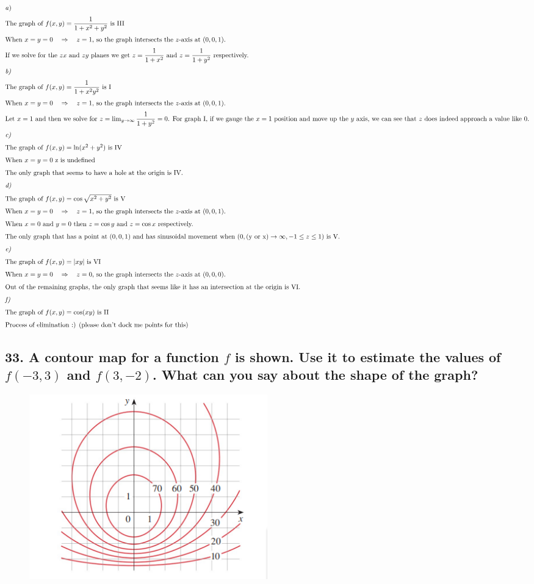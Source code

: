 \documentclass{article}
\newcommand\rr{\quad\Rightarrow\quad}
\begin{document}
\begin{align*}
    \intertext{\textit a)}
    \intertext{The graph of $f(x,y) = \displaystyle\frac 1 {1 + x^2 + y^2}$ is III}
    \intertext{When $x = y = 0 \rr z = 1$, so the graph intersects the $z$-axis at $(0,0,1)$.}
    \intertext{If we solve for the $zx$ and $zy$ planes we get $z = \displaystyle\frac 1 {1 + x^2}$ and $z = \displaystyle\frac 1 {1 + y^2}$ respectively.}
    \intertext{\textit{b)}}
    \intertext{The graph of $f(x,y) = \displaystyle\frac 1 {1 + x^2 y^2}$ is I}
    \intertext{When $x = y = 0 \rr z = 1$, so the graph intersects the $z$-axis at $(0,0,1)$.}
    \intertext{Let $x = 1$ and then we solve for $z = \lim_{y \to \infty} \displaystyle\frac 1 {1 + y^2} = 0$. For graph I, if we gauge the $x = 1$ position and move up the $y$ axis, we can see that $z$ does indeed approach a value like 0.}
    \intertext{\textit{c)}}
    \intertext{The graph of $f(x,y) = \ln (x^2 + y^2)$ is IV}
    \intertext{When $x = y = 0$ z is undefined}
    \intertext{The only graph that seems to have a hole at the origin is IV.}
    \intertext{\textit{d)}} 
    \intertext{The graph of $f(x,y) = \cos \sqrt{x^2 + y^2}$ is V}
    \intertext{When $x = y = 0 \rr z = 1$, so the graph intersects the $z$-axis at $(0,0,1)$.}
    \intertext{When $x = 0$ and $y=0$ then $z=\cos y$ and $z=\cos x$ respectively.}
    \intertext{The only graph that has a point at $(0,0,1)$ and has sinusoidal movement when $(0, (\text{y or x}) \to \infty, -1 \leq z \leq 1)$ is V.}
    \intertext{\textit{e)}}
    \intertext{The graph of $f(x,y) = |xy|$ is VI}
    \intertext{When $x = y = 0 \rr z = 0$, so the graph intersects the $z$-axis at $(0,0,0)$.}
    \intertext{Out of the remaining graphs, the only graph that seems like it has an intersection at the origin is VI.}
    \intertext{\textit{f)}}
    \intertext{The graph of $f(x,y) = \cos (xy)$ is II}
    \intertext{Process of elimination :) (please don't dock me points for this)}
\end{align*}

\subsection*{33. A contour map for a function $f$ is shown. Use it to estimate the values of $f(-3, 3)$ and $f(3, -2)$. What can you say about the shape of the graph?}

\begin{figure}
    \begin{center}
        \includegraphics[width=0.5\textwidth]{figures/33.png}
    \end{center}
\end{figure}
\end{document}
